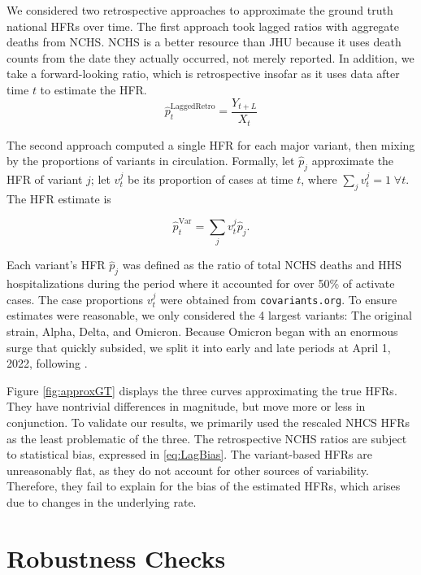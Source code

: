 \documentclass{article}
\begin{document}
We considered two retrospective approaches to approximate the ground truth national HFRs over time. The first approach took lagged ratios with aggregate deaths from NCHS. NCHS is a better resource than JHU because it uses death counts from the date they actually occurred, not merely reported. In addition, we take a forward-looking ratio, which is retrospective insofar as it uses data after time $t$ to estimate the HFR.
$$\hat{p}_t^{\text{LaggedRetro}} = \frac{Y_{t+L}}{X_t}$$ %
    

The second approach computed a single HFR for each major variant, then mixing by the proportions of variants in circulation. Formally, let $\hat{p}_j$ approximate the HFR of variant $j$; let $v_t^j$ be its proportion of cases at time $t$, where $\sum_j v_t^j = 1 \; \forall t$. The HFR estimate is

$$\hat{p}_t^{\text{Var}} = \sum_j v_t^j \hat{p}_j.$$

Each variant's HFR $\hat p_j$ was defined as the ratio of total NCHS deaths and HHS hospitalizations during the period where it accounted for over 50\% of activate cases. The case proportions $v_t^j$ were obtained from \texttt{covariants.org}. To ensure estimates were reasonable, we only considered the 4 largest variants: The original strain, Alpha, Delta, and Omicron. Because Omicron began with an enormous surge that quickly subsided, we split it into early and late periods at April 1, 2022, following \cite{adjei2022mortality}.

Figure \ref{fig:approxGT} displays the three curves approximating the true HFRs. They have nontrivial differences in magnitude, but move more or less in conjunction. To validate our results, we primarily used the rescaled NHCS HFRs as the least problematic of the three. The retrospective NCHS ratios are subject to statistical bias, expressed in \ref{eq:LagBias}. The variant-based HFRs are unreasonably flat, as they do not account for other sources of variability. Therefore, they fail to explain for the bias of the estimated HFRs, which arises due to changes in the underlying rate. 

\section{Robustness Checks}\label{apx:robustness}
\end{document}
